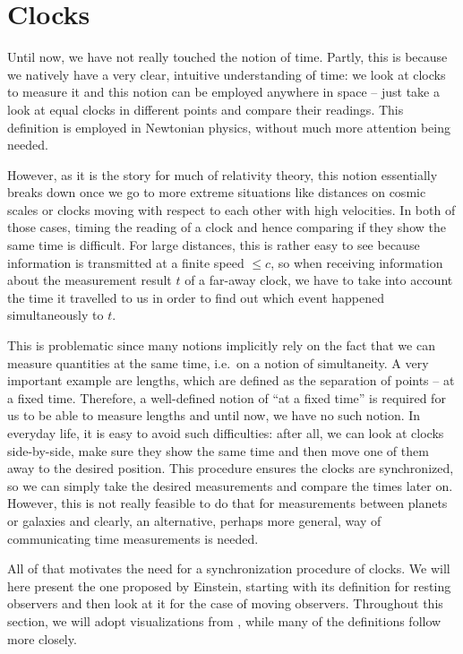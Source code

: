 \newpage



	\section{Clocks}\label{sec:clocks}
Until now, we have not really touched the notion of time. Partly, this is because we natively have a very clear, intuitive understanding of time: we look at clocks to measure it and this notion can be employed anywhere in space -- just take a look at equal clocks in different points and compare their readings. This definition is employed in Newtonian physics, without much more attention being needed.


However, as it is the story for much of relativity theory, this notion essentially breaks down once we go to more extreme situations like distances on cosmic scales or clocks moving with respect to each other with high velocities. In both of those cases, timing the reading of a clock and hence comparing if they show the same time is difficult. For large distances, this is rather easy to see because information is transmitted at a finite speed $\leq c$, so when receiving information about the measurement result $t$ of a far-away clock, we have to take into account the time it travelled to us in order to find out which event happened simultaneously to $t$.

This is problematic since many notions implicitly rely on the fact that we can measure quantities at the same time, i.e.~on a notion of simultaneity. A very important example are lengths, which are defined as the separation of points -- at a fixed time. Therefore, a well-defined notion of \enquote{at a fixed time} is required for us to be able to measure lengths and until now, we have no such notion. In everyday life, it is easy to avoid such difficulties: after all, we can look at clocks side-by-side, make sure they show the same time and then move one of them away to the desired position. This procedure ensures the clocks are synchronized, so we can simply take the desired measurements and compare the times later on. However, this is not really feasible to do that for measurements between planets or galaxies and clearly, an alternative, perhaps more general, way of communicating time measurements is needed.


All of that motivates the need for a synchronization procedure of clocks. We will here present the one proposed by Einstein, starting with its definition for resting observers and then look at it for the case of moving observers. Throughout this section, we will adopt visualizations from \cite{dragon_geometry_srt}, while many of the definitions follow \cite{giulini_srt} more closely.



